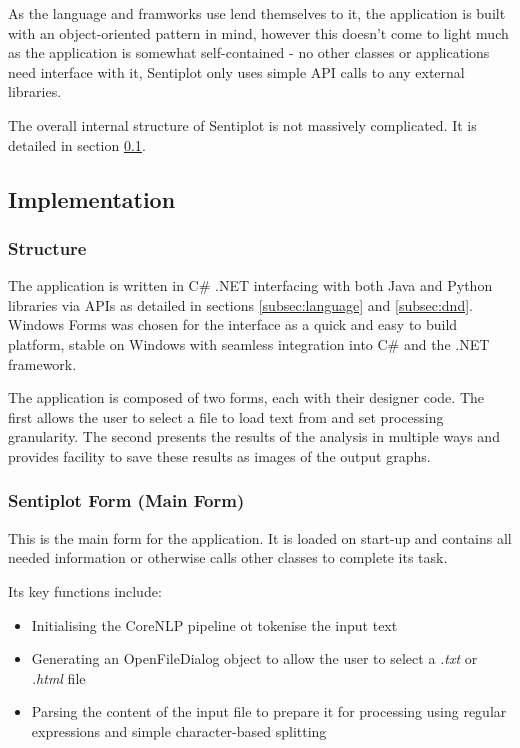 \documentclass[a4paper]{article}
\begin{document}
        As the language and framworks use lend themselves to it, the application is built with an object-oriented pattern in mind, however this doesn't come to light much as the application is somewhat self-contained - no other classes or applications need interface with it, Sentiplot only uses simple API calls to any external libraries.

        The overall internal structure of Sentiplot is not massively complicated. It is detailed in section \ref{subsec:implementation}.
    \subsection{Implementation}
    \label{subsec:implementation}
        \subsubsection{Structure}
            The application is written in C\# .NET interfacing with both Java and Python libraries via APIs as detailed in sections \ref{subsec:language} and \ref{subsec:dnd}. Windows Forms was chosen for the interface as a quick and easy to build platform, stable on Windows with seamless integration into C\# and the .NET framework.

            The application is composed of two forms, each with their designer code. The first allows the user to select a file to load text from and set processing granularity. The second presents the results of the analysis in multiple ways and provides facility to save these results as images of the output graphs.
        \subsubsection{Sentiplot Form (Main Form)}
            This is the main form for the application. It is loaded on start-up and contains all needed information or otherwise calls other classes to complete its task.

            Its key functions include:
            \begin{itemize}
                \item Initialising the CoreNLP pipeline ot tokenise the input text
                \item Generating an OpenFileDialog object to allow the user to select a \textit{.txt} or \textit{.html} file
                \item Parsing the content of the input file to prepare it for processing using regular expressions and simple character-based splitting
            \end{itemize}
\end{document}
